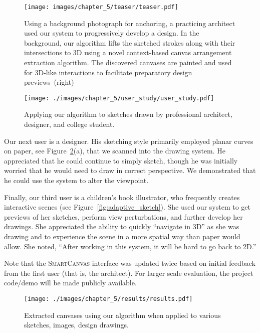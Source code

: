 \begin{figure}[t!]
  \texttt{[image: images/chapter\_5/teaser/teaser.pdf]}
   \caption[A complete design.]{Using a background photograph for anchoring, a practicing architect used our system to progressively develop a design.
    In the background, our algorithm lifts the sketched strokes along with their intersections to 3D using a novel context-based canvas arrangement extraction algorithm. The discovered canvases are painted and used for 3D-like interactions to facilitate preparatory design previews~(right)}
   \label{fig:teaser}
\end{figure}

\begin{figure}[t!]
  \texttt{[image: ./images/chapter\_5/user\_study/user\_study.pdf]}
  \caption[User study.]{Applying our algorithm to sketches drawn by professional architect, designer, and college student.
  \label{fig:design_sketches}
  }
\end{figure}


Our next user is a designer.  His sketching style primarily employed planar curves on paper, see Figure~\ref{fig:design_sketches}(a), that we scanned into the drawing system. He appreciated that he could continue to simply sketch, though he was initially worried that he would need to draw in correct perspective. We demonstrated that he could use the system to alter the viewpoint.




Finally, our third user is a children's book illustrator, who frequently creates interactive scenes (see Figure~\ref{fig:adaptive_sketch}). She used our system to get previews of her sketches, perform view perturbations, and further develop her drawings. She appreciated the ability to quickly ``navigate in 3D'' as she was drawing and to experience the scene in a more spatial way than paper would allow. She noted, ``After working in this system, it will be hard to go back to 2D.''


Note that the \textsc{SmartCanvas} interface was updated twice based on initial feedback from the first user (that is, the architect).  For larger scale evaluation, the project code/demo will be made publicly available.






\begin{figure*}[t!]
  \texttt{[image: ./images/chapter\_5/results/results.pdf]}
  \caption{Extracted canvases using our algorithm when applied to various sketches, images, design drawings.
  \label{fig:results}
  }
\end{figure*}
